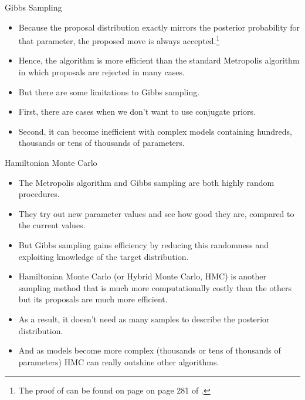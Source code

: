 \documentclass[handout]{beamer}
\begin{document}
\begin{frame}{Gibbs Sampling}
\scriptsize{

\begin{itemize}

\item Because the proposal distribution exactly mirrors the posterior probability for that parameter, the proposed move is always accepted.\footnote{The proof of can be found on page on page 281 of \cite{gelman2013bayesian}.}

\item Hence, the algorithm is more efficient than the standard Metropolis algorithm in which proposals are rejected in many cases.

\item But there are some limitations to Gibbs sampling.

\item First, there are cases when we don't want to use conjugate priors. 

\item Second, it can become inefficient with complex models containing hundreds, thousands or tens of thousands of parameters.


\end{itemize}


} 
\end{frame}



\begin{frame}{Hamiltonian Monte Carlo}
\scriptsize{

\begin{itemize}
\item The Metropolis algorithm and Gibbs sampling are both highly random procedures.
\item They try out new parameter values and see how good they are, compared to the current values.
\item But Gibbs sampling gains efficiency by reducing this randomness and exploiting knowledge of the target distribution. 

\item Hamiltonian Monte Carlo (or Hybrid Monte Carlo, HMC) is another sampling method that is much more computationally costly than the others but its proposals are much more efficient.

\item As a result, it doesn't need as many samples to describe the posterior distribution. 
\item And as models become more complex (thousands or tens of thousands of parameters) HMC can really outshine other algorithms.

\end{itemize}


} 
\end{frame}
\end{document}
